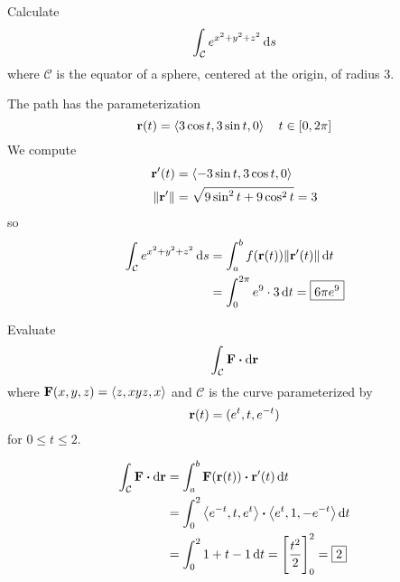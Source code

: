 \documentclass[12pt,answers]{exam}
\newcommand{\vect}[1]{\left\langle #1\right\rangle}
\begin{document}
\begin{questions}

	\newpage
	\question[15] Calculate
	\[
		\int_{\mathcal C} e^{x^2+y^2+z^2} \dif s
	\]
	where $\mathcal C$ is the equator of a sphere, centered at the origin, of radius 3.
	\begin{solution}
		The path has the parameterization
		\[
			\vb{r}(t) = \vect{3\cos t, 3\sin t, 0} \quad t \in [0, 2\pi]
		\]
		We compute
		\begin{align*}
			\vb{r}'(t) &= \vect{-3\sin t, 3 \cos t, 0} \\
			\|\vb{r}'\| &= \sqrt{9\sin^2 t + 9 \cos^2 t} = 3
		\end{align*}
		so
		\begin{align*}
			\int_{\mathcal C} e^{x^2+y^2+z^2} \dif s
			&= \int_a^b f(\vb{r}(t)) \| \vb{r}'(t)\| \dif t \\
			&= \int_0^{2\pi} e^9  \cdot 3 \dif t
			= \boxed{6\pi e^9}
		\end{align*}
	\end{solution}

	\newpage
	\question[10]
	Evaluate
	\[
		\int_{\mathcal C} \vb{F} \vdot \dif \vb{r}
	\]
	where $\vb F(x,y,z) = \vect{z, xyz, x}$ and $\mathcal C$ is the curve parameterized by 
	\[
		\vb{r}(t) = (e^t, t, e^{-t})
	\]
	for $0 \le t \le 2$.
	\begin{solution}
		\begin{align*}
			\int_{\mathcal C} \vb{F} \vdot \dif \vb{r} 
			&= \int_a^b \vb{F}(\vb{r}(t)) \vdot \vb{r}'(t) \dif t \\
			&= \int_0^2 \vect{e^{-t}, t, e^t} \vdot \vect{e^t, 1, -e^{-t}} \dif t \\
			&= \int_0^2 1 + t - 1 \dif t
			= \left[\frac{t^2}{2}\right]_0^2
			= \boxed{2}
		\end{align*}
	\end{solution}


\end{questions}
\end{document}
